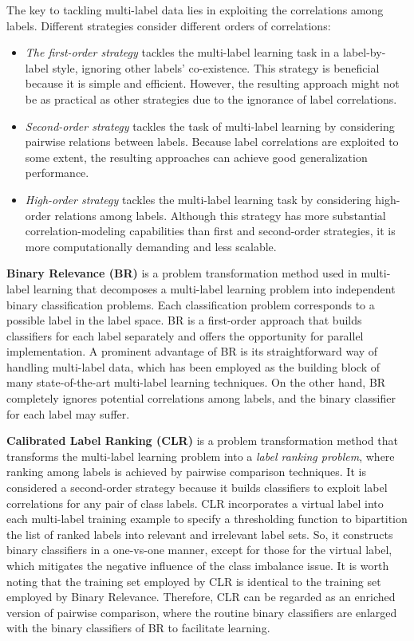 The key to tackling multi-label data lies in exploiting the correlations among labels. Different strategies consider different orders of correlations:
\begin{itemize}
    \item \textit{The first-order strategy} tackles the multi-label learning task in a label-by-label style, ignoring other labels' co-existence. This strategy is beneficial because it is simple and efficient. However, the resulting approach might not be as practical as other strategies due to the ignorance of label correlations.
    \item \textit{Second-order strategy} tackles the task of multi-label learning by considering pairwise relations between labels. Because label correlations are exploited to some extent, the resulting approaches can achieve good generalization performance.
    \item \textit{High-order strategy} tackles the multi-label learning task by considering high-order relations among labels. Although this strategy has more substantial correlation-modeling capabilities than first and second-order strategies, it is more computationally demanding and less scalable.
\end{itemize}

\textbf{Binary Relevance (BR)} is a problem transformation method used in multi-label learning that decomposes a multi-label learning problem into independent binary classification problems. Each classification problem corresponds to a possible label in the label space. BR is a first-order approach that builds classifiers for each label separately and offers the opportunity for parallel implementation. A prominent advantage of BR is its straightforward way of handling multi-label data, which has been employed as the building block of many state-of-the-art multi-label learning techniques. On the other hand, BR completely ignores potential correlations among labels, and the binary classifier for each label may suffer. \cite{zhang2014}

\textbf{Calibrated Label Ranking (CLR)} is a problem transformation method that transforms the multi-label learning problem into a \textit{label ranking problem}, where ranking among labels is achieved by pairwise comparison techniques. It is considered a second-order strategy because it builds classifiers to exploit label correlations for any pair of class labels. CLR incorporates a virtual label into each multi-label training example to specify a thresholding function to bipartition the list of ranked labels into relevant and irrelevant label sets. So, it constructs binary classifiers in a one-vs-one manner, except for those for the virtual label, which mitigates the negative influence of the class imbalance issue. It is worth noting that the training set employed by CLR is identical to the training set employed by Binary Relevance. Therefore, CLR can be regarded as an enriched version of pairwise comparison, where the routine binary classifiers are enlarged with the binary classifiers of BR to facilitate learning. \cite{zhang2014}

